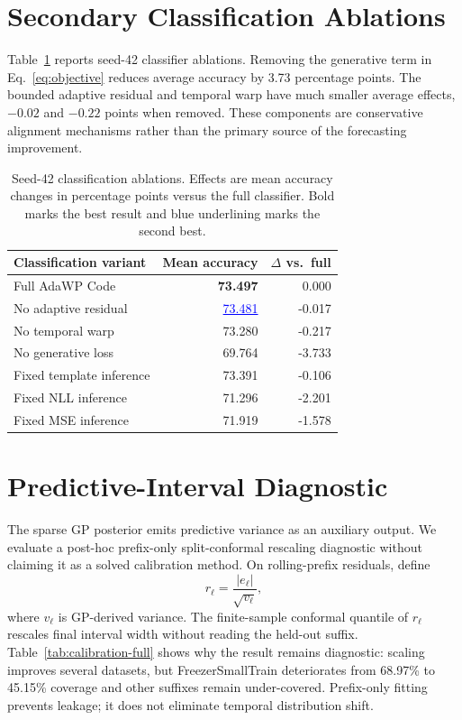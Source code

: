 \documentclass[11pt]{article}
\newcommand{\method}{AdaWP Code}
\newcommand{\best}[1]{\textbf{#1}}
\newcommand{\second}[1]{\textcolor{blue}{\underline{#1}}}
\begin{document}
\section{Secondary Classification Ablations}
\label{app:classification-ablation}

Table~\ref{tab:classification-ablation} reports seed-42 classifier ablations. Removing the generative term in Eq.~\eqref{eq:objective} reduces average accuracy by 3.73 percentage points. The bounded adaptive residual and temporal warp have much smaller average effects, $-0.02$ and $-0.22$ points when removed. These components are conservative alignment mechanisms rather than the primary source of the forecasting improvement.

\begin{table}[H]
\centering
\caption{Seed-42 classification ablations. Effects are mean accuracy changes in percentage points versus the full classifier. Bold marks the best result and blue underlining marks the second best.}
\label{tab:classification-ablation}
\small
\begin{tabular}{lrr}
\toprule
Classification variant & Mean accuracy & $\Delta$ vs.\ full \\
\midrule
Full \method{}                & \best{73.497} & 0.000 \\
No adaptive residual          & \second{73.481} & -0.017 \\
No temporal warp              & 73.280 & -0.217 \\
No generative loss            & 69.764 & -3.733 \\
Fixed template inference      & 73.391 & -0.106 \\
Fixed NLL inference           & 71.296 & -2.201 \\
Fixed MSE inference           & 71.919 & -1.578 \\
\bottomrule
\end{tabular}
\end{table}

\section{Predictive-Interval Diagnostic}
\label{app:calibration}

The sparse GP posterior emits predictive variance as an auxiliary output. We evaluate a post-hoc prefix-only split-conformal rescaling diagnostic without claiming it as a solved calibration method. On rolling-prefix residuals, define
\begin{equation}
  r_\ell=\frac{|e_\ell|}{\sqrt{v_\ell}},
\end{equation}
where $v_\ell$ is GP-derived variance. The finite-sample conformal quantile of $r_\ell$ rescales final interval width without reading the held-out suffix. Table~\ref{tab:calibration-full} shows why the result remains diagnostic: scaling improves several datasets, but FreezerSmallTrain deteriorates from 68.97\% to 45.15\% coverage and other suffixes remain under-covered. Prefix-only fitting prevents leakage; it does not eliminate temporal distribution shift.
\end{document}
